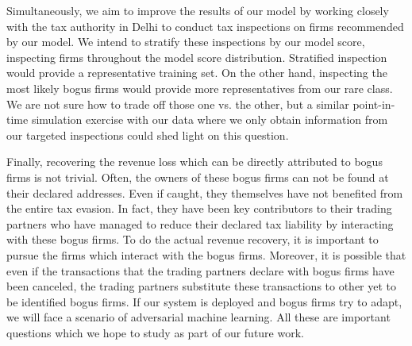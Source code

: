 Simultaneously, we aim to improve the results of our model by working closely with the tax authority in Delhi to conduct tax inspections on firms recommended by our model. We intend to stratify these inspections by our model score, inspecting firms throughout the model score distribution. Stratified inspection would provide a representative training set. On the other hand, inspecting the most likely bogus firms would provide more representatives from our rare class. We are not sure how to trade off those one vs. the other, but a similar point-in-time simulation exercise with our data where we only obtain information from our targeted inspections could shed light on this question.

Finally, recovering the revenue loss which can be directly attributed to bogus firms is not trivial. Often, the owners of these bogus firms can not be found at their declared addresses. Even if caught, they themselves have not benefited from the entire tax evasion. In fact, they have been key contributors to their trading partners who have managed to reduce their declared tax liability by interacting with these bogus firms. To do the actual revenue recovery, it is important to pursue the firms which interact with the bogus firms. Moreover, it is possible that even if the transactions that the trading partners declare with bogus firms have been canceled, the trading partners substitute these transactions to other yet to be identified bogus firms. If our system is deployed and bogus firms try to adapt, we will face a scenario of adversarial machine learning. All these are important questions which we hope to study as part of our future work.


%
%
